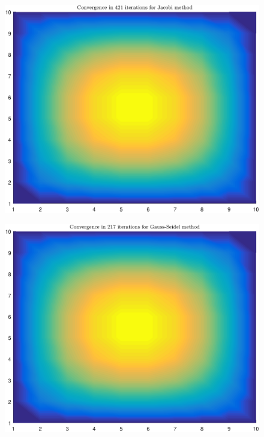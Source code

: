 \documentclass[11pt]{article}
\begin{document}
\begin{figure}
\centering
\begin{minipage}{.45\textwidth}
\centering
\includegraphics[width=\linewidth]{math609_pa2_comp_example_2_8_n_Jacobi.eps}
\label{fig:test1}
\end{minipage}\hfill
\begin{minipage}{.45\textwidth}
\centering
\includegraphics[width=\linewidth]{math609_pa2_comp_example_2_8_n_Gauss-Seidel.eps}

\end{minipage}
\end{figure}
\end{document}
